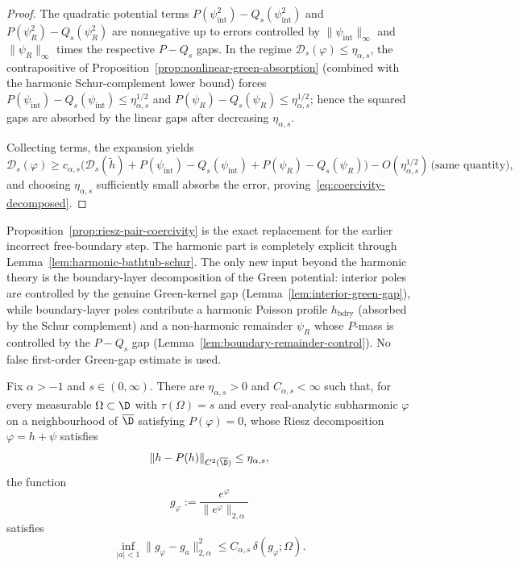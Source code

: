 \begin{proof}
The quadratic potential terms
$P(\psi_{\mathrm{int}}^2)-Q_s(\psi_{\mathrm{int}}^2)$ and
$P(\psi_R^2)-Q_s(\psi_R^2)$ are nonnegative up to errors controlled by
$\|\psi_{\mathrm{int}}\|_\infty$ and $\|\psi_R\|_\infty$ times the
respective $P-Q_s$ gaps.  In the regime $\mathcal D_s(\varphi)\le\eta_{\alpha,s}$,
the contrapositive of Proposition~\ref{prop:nonlinear-green-absorption}
(combined with the harmonic Schur-complement lower bound) forces
$P(\psi_{\mathrm{int}})-Q_s(\psi_{\mathrm{int}})\le\eta_{\alpha,s}^{1/2}$
and $P(\psi_R)-Q_s(\psi_R)\le\eta_{\alpha,s}^{1/2}$; hence the squared gaps
are absorbed by the linear gaps after decreasing $\eta_{\alpha,s}$.

Collecting terms, the expansion yields
\[
\mathcal D_s(\varphi)
\ge
c_{\alpha,s}\bigl(\mathcal D_s(\widetilde h)
+P(\psi_{\mathrm{int}})-Q_s(\psi_{\mathrm{int}})
+P(\psi_R)-Q_s(\psi_R)\bigr)
-O(\eta_{\alpha,s}^{1/2})\,\text{(same quantity)},
\]
and choosing $\eta_{\alpha,s}$ sufficiently small absorbs the error,
proving~\eqref{eq:coercivity-decomposed}.
\end{proof}

\begin{numrem}
Proposition~\ref{prop:riesz-pair-coercivity} is the exact replacement for
the earlier incorrect free-boundary step.  The harmonic part is completely
explicit through Lemma~\ref{lem:harmonic-bathtub-schur}.  The only new input
beyond the harmonic theory is the boundary-layer decomposition of the Green
potential: interior poles are controlled by the genuine Green-kernel gap
(Lemma~\ref{lem:interior-green-gap}), while boundary-layer poles contribute
a harmonic Poisson profile $h_{\mathrm{bdry}}$ (absorbed by the Schur
complement) and a non-harmonic remainder $\psi_R$ whose $P$-mass is
controlled by the $P-Q_s$ gap (Lemma~\ref{lem:boundary-remainder-control}).
No false first-order Green-gap estimate is used.
\end{numrem}


\begin{numthm}\label{thm:local-pair-half}
Fix $\alpha>-1$ and $s\in(0,\infty)$. There are
$\eta_{\alpha,s}>0$ and $C_{\alpha,s}<\infty$ such that, for every measurable
$\Omega\subset\D$ with $\tau(\Omega)=s$ and every real-analytic subharmonic
$\varphi$ on a neighbourhood of $\overline\D$ satisfying
$P(\varphi)=0$, whose Riesz decomposition $\varphi=h+\psi$ satisfies
\[
\|h-P(h)\|_{C^2(\overline\D)}\le\eta_{\alpha,s},
\]
the function
\[
g_\varphi:=\frac{e^\varphi}{\|e^\varphi\|_{2,\alpha}}
\]
satisfies
\[
\inf_{|a|<1}\|g_\varphi-g_a\|_{2,\alpha}^2
\le
C_{\alpha,s}\,\delta(g_\varphi;\Omega).
\]
\end{numthm}

